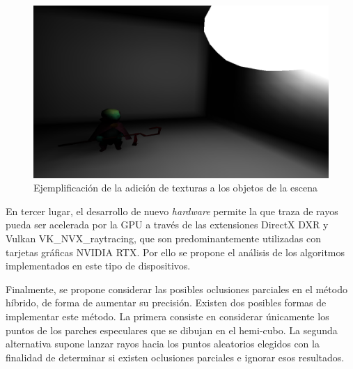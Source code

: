 \begin{figure}[H]
	\centering
	\includegraphics[width=.7\linewidth]{assets/text}
	\caption{Ejemplificación de la adición de texturas a los objetos de la escena}
	\label{img:text}
\end{figure}

En tercer lugar, el desarrollo de nuevo \textit{hardware} permite la que traza de rayos pueda ser acelerada por la GPU a través de las extensiones DirectX DXR y Vulkan VK\_NVX\_raytracing, que son predominantemente utilizadas con tarjetas gráficas NVIDIA RTX. Por ello se propone el análisis de los algoritmos implementados en este tipo de dispositivos.

Finalmente, se propone considerar las posibles oclusiones parciales en el método híbrido, de forma de aumentar su precisión. Existen dos posibles formas de implementar este método. La primera consiste en considerar únicamente los puntos de los parches especulares que se dibujan en el hemi-cubo. La segunda alternativa supone lanzar rayos hacia los puntos aleatorios elegidos con la finalidad de determinar si existen oclusiones parciales e ignorar esos resultados.